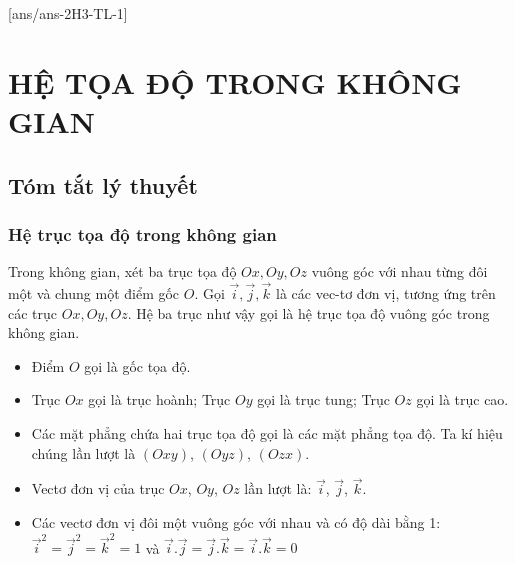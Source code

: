 [ans/ans-2H3-TL-1]
\setcounter{chapter}{2}
\section{HỆ TỌA ĐỘ TRONG KHÔNG GIAN}
\subsection{Tóm tắt lý thuyết}
\begin{tomtat}
	\subsubsection{Hệ trục tọa độ trong không gian}
	Trong không gian, xét ba trục tọa độ $Ox, Oy, Oz$ vuông góc với nhau từng đôi một và chung một điểm gốc $O$. Gọi $\overrightarrow{i}, \overrightarrow{j}, \overrightarrow{k}$ là các vec-tơ đơn vị, tương ứng trên các trục $Ox, Oy, Oz$. Hệ ba trục như vậy gọi là hệ trục tọa độ vuông góc trong không gian.
	\begin{center}
	\end{center}

\begin{itemize}
\item Điểm $O$ gọi là gốc tọa độ.
\item Trục $Ox$ gọi là trục hoành; Trục $Oy$ gọi là trục tung; Trục $Oz$ gọi là trục cao.
\item Các mặt phẳng chứa hai trục tọa độ gọi là các mặt phẳng tọa độ. Ta kí hiệu chúng lần lượt là $\left(Oxy\right)$, $\left(Oyz\right)$, $\left(Ozx\right)$.
\item Vectơ đơn vị của trục $Ox$, $Oy$, $Oz$ lần lượt là: $\vec{i}$, $\vec{j}$, $\vec{k}$.
\item Các vectơ đơn vị đôi một vuông góc với nhau và có độ dài bằng 1:
${\vec{i}}^2={\vec{j}}^2={\vec{k}}^2=1$  và $\vec{i}.\vec{j}=\vec{j}.\vec{k}=\vec{i}.\vec{k}=0$
\end{itemize}

\end{tomtat}
